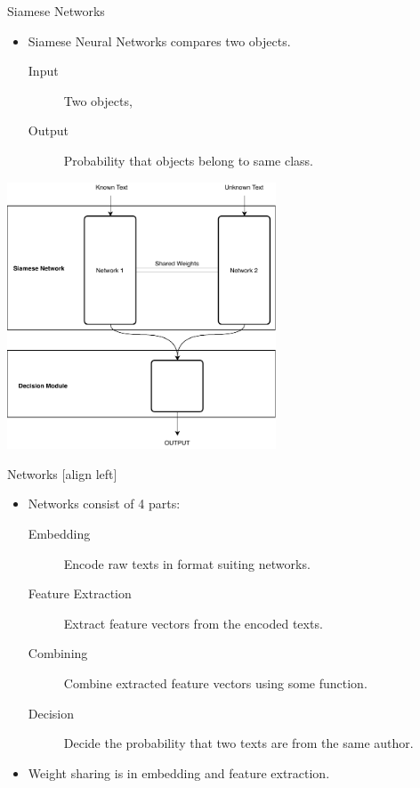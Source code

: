 \documentclass[10pt]{beamer}
\begin{document}
\begin{frame}[fragile]{Siamese Networks}
    \begin{itemize}
        \item Siamese Neural Networks compares two objects.

            \begin{description}
                \item[Input] Two objects,
                \item[Output] Probability that objects belong to same class.
            \end{description}
    \end{itemize}

    \begin{center}
        \includegraphics[width=0.6\textwidth]{../../report/pictures/method/siamese}
    \end{center}
\end{frame}

\begin{frame}[fragile]{Networks}
    [align left]
    \begin{itemize}
        \item Networks consist of 4 parts:

            \begin{description}
                \item[Embedding] Encode raw texts in format suiting networks.
                \item[Feature Extraction] Extract feature vectors from the
                    encoded texts.
                \item[Combining] Combine extracted feature vectors using some
                    function.
                \item[Decision] Decide the probability that two texts are from
                    the same author.
            \end{description}

        \item Weight sharing is in embedding and feature extraction.
    \end{itemize}
\end{frame}
\end{document}
